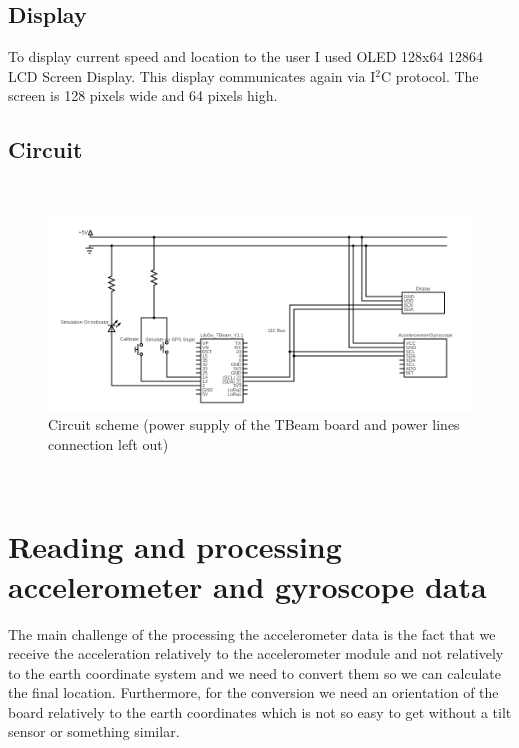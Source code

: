 \documentclass[hidelinks,a4paper]{article}
\begin{document}
\subsection{Display}
To display current speed and location to the user I used OLED 128x64 12864 LCD Screen Display. This display communicates again via I${}^2$C protocol. The screen is 128 pixels wide and 64 pixels high.
\subsection{Circuit}

${}$
\begin{figure}[h]
    \includegraphics[width=15cm]{img/circuit.png}
    \caption{Circuit scheme (power supply of the TBeam board and power lines connection left out)}
\end{figure}
${}$

\section{Reading and processing accelerometer and gyroscope data}
The main challenge of the processing the accelerometer data is the fact that we receive the acceleration relatively to the accelerometer module and not relatively to the earth coordinate system and we need to convert them so we can calculate the final location. Furthermore, for the conversion we need an orientation of the board relatively to the earth coordinates which is not so easy to get without a tilt sensor or something similar.
\end{document}
